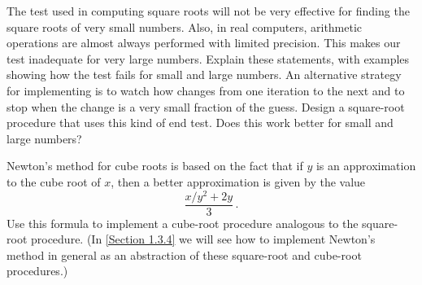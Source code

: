 \begin{exercise}
	\label{Exercise 1.7}
	The  test used in computing square roots will not be very effective for finding the square roots of very small numbers.
	Also, in real computers, arithmetic operations are almost always performed with limited precision.
	This makes our test inadequate for very large numbers.
	Explain these statements, with examples showing how the test fails for small and large numbers.
	An alternative strategy for implementing  is to watch how  changes from one iteration to the next and to stop when the change is a very small fraction of the guess.
	Design a square-root procedure that uses this kind of end test.
	Does this work better for small and large numbers?
\end{exercise}



\begin{exercise}
	\label{Exercise 1.8}
	Newton’s method for cube roots is based on the fact that if \( y \) is an approximation to the cube root of \( x \), then a better approximation is given by the value
	\[
		\frac{x / y^2 + 2y}{3} \,.
	\]
	Use this formula to implement a cube-root procedure analogous to the square-root procedure.
	(In \cref{Section 1.3.4} we will see how to implement Newton’s method in general as an abstraction of these square-root and cube-root procedures.)
\end{exercise}
